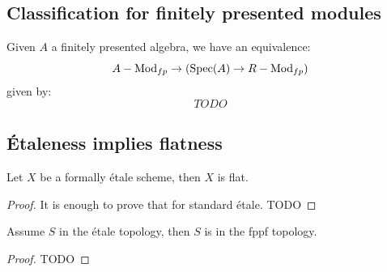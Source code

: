 \subsection{Classification for finitely presented modules}

\begin{lemma}
Given $A$ a finitely presented algebra, we have an equivalence:
\[A-\mathrm{Mod}_{fp} \to (\operatorname{Spec}(A)\to R-\mathrm{Mod}_{fp})\]
given by:
\[TODO\]
\end{lemma}



\subsection{\'Etaleness implies flatness}

\begin{lemma}
Let $X$ be a formally \'etale scheme, then $X$ is flat.
\end{lemma}

\begin{proof}
It is enough to prove that for standard \'etale. TODO
\end{proof}

\begin{theorem}\label{etale-topology-included-fppf}
Assume $S$ in the \'etale topology, then $S$ is in the fppf topology.
\end{theorem}

\begin{proof}
TODO
\end{proof}